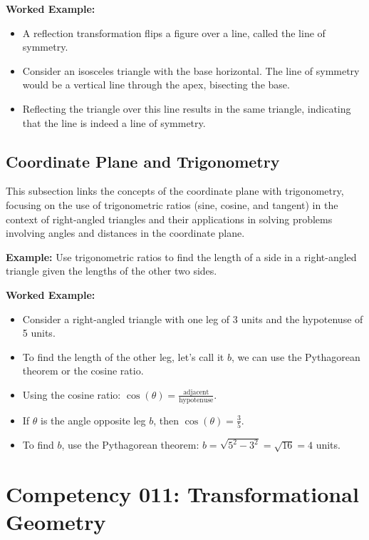 \documentclass{book}
\begin{document}
\textbf{Worked Example:}
\begin{itemize}
        \item A reflection transformation flips a figure over a line, called the line of symmetry.
        \item Consider an isosceles triangle with the base horizontal. The line of symmetry would be a vertical line through the apex, bisecting the base.
        \item Reflecting the triangle over this line results in the same triangle, indicating that the line is indeed a line of symmetry.
\end{itemize}


\subsection{Coordinate Plane and Trigonometry}
This subsection links the concepts of the coordinate plane with trigonometry, focusing on the use of trigonometric ratios (sine, cosine, and tangent) in the context of right-angled triangles and their applications in solving problems involving angles and distances in the coordinate plane.


\textbf{Example:} Use trigonometric ratios to find the length of a side in a right-angled triangle given the lengths of the other two sides.


\textbf{Worked Example:}
\begin{itemize}
        \item Consider a right-angled triangle with one leg of 3 units and the hypotenuse of 5 units.
        \item To find the length of the other leg, let's call it \( b \), we can use the Pythagorean theorem or the cosine ratio.
        \item Using the cosine ratio: \( \cos(\theta) = \frac{\text{adjacent}}{\text{hypotenuse}} \).
        \item If \( \theta \) is the angle opposite leg \( b \), then \( \cos(\theta) = \frac{3}{5} \).
        \item To find \( b \), use the Pythagorean theorem: \( b = \sqrt{5^2 - 3^2} = \sqrt{16} = 4 \) units.
\end{itemize}



\section{Competency 011: Transformational Geometry}
\end{document}
